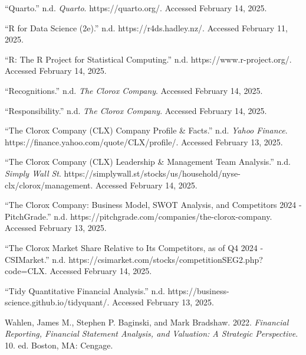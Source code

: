 \documentclass[
  letterpaper,
  DIV=11,
  numbers=noendperiod]{scrartcl}
\newlength{\cslhangindent}
\newenvironment{CSLReferences}[2] %
 {\begin{list}{}{%
  \setlength{\itemindent}{0pt}
  \setlength{\leftmargin}{0pt}
  \setlength{\parsep}{0pt}
  \ifodd #1
   \setlength{\leftmargin}{\cslhangindent}
   \setlength{\itemindent}{-1\cslhangindent}
  \fi
  \setlength{\itemsep}{#2\baselineskip}}}
 {\end{list}}
\begin{document}
\begin{CSLReferences}{1}{0}
{``Quarto.''} n.d. \emph{Quarto}. https://quarto.org/. Accessed February
14, 2025.

{``R for {Data Science} (2e).''} n.d. https://r4ds.hadley.nz/. Accessed
February 11, 2025.

{``R: {The R Project} for {Statistical Computing}.''} n.d.
https://www.r-project.org/. Accessed February 14, 2025.

{``Recognitions.''} n.d. \emph{The Clorox Company}. Accessed February
14, 2025.

{``Responsibility.''} n.d. \emph{The Clorox Company}. Accessed February
14, 2025.

{``The {Clorox Company} ({CLX}) {Company Profile} \& {Facts}.''} n.d.
\emph{Yahoo Finance}. https://finance.yahoo.com/quote/CLX/profile/.
Accessed February 13, 2025.

{``The {Clorox Company} ({CLX}) {Leadership} \& {Management Team
Analysis}.''} n.d. \emph{Simply Wall St}.
https://simplywall.st/stocks/us/household/nyse-clx/clorox/management.
Accessed February 14, 2025.

{``The {Clorox Company}: {Business Model}, {SWOT Analysis}, and
{Competitors} 2024 - {PitchGrade}.''} n.d.
https://pitchgrade.com/companies/the-clorox-company. Accessed February
13, 2025.

{``The {Clorox Market} Share Relative to Its Competitors, as of {Q4}
2024 - {CSIMarket}.''} n.d.
https://csimarket.com/stocks/competitionSEG2.php?code=CLX. Accessed
February 14, 2025.

{``Tidy {Quantitative Financial Analysis}.''} n.d.
https://business-science.github.io/tidyquant/. Accessed February 13,
2025.

Wahlen, James M., Stephen P. Baginski, and Mark Bradshaw. 2022.
\emph{Financial Reporting, Financial Statement Analysis, and Valuation:
A Strategic Perspective}. 10. ed. Boston, MA: Cengage.

\end{CSLReferences}
\end{document}
